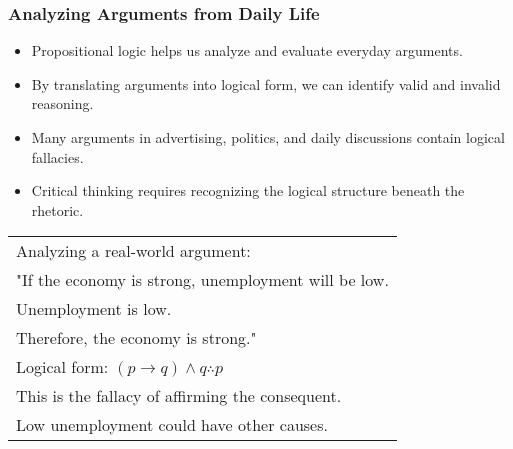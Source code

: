 \documentclass{beamer}
\begin{document}
                                \begin{frame}
                                \frametitle{Analyzing Arguments from Daily Life}
                                \begin{itemize}
                                    \item Propositional logic helps us analyze and evaluate everyday arguments.
                                    \item By translating arguments into logical form, we can identify valid and invalid reasoning.
                                    \item Many arguments in advertising, politics, and daily discussions contain logical fallacies.
                                    \item Critical thinking requires recognizing the logical structure beneath the rhetoric.
                                \end{itemize}
                                
                                \begin{center}
                                    \scriptsize
                                \begin{tabular}{|p{}|}
                                \hline
                                Analyzing a real-world argument:\\[0.2cm]
                                "If the economy is strong, unemployment will be low.\\
                                Unemployment is low.\\
                                Therefore, the economy is strong."\\[0.3cm]
                                Logical form: $(p \rightarrow q) \wedge q \therefore p$\\
                                This is the fallacy of affirming the consequent.\\
                                Low unemployment could have other causes.\\
                                \hline
                                \end{tabular}
                                \end{center}
                                \end{frame}
\end{document}
